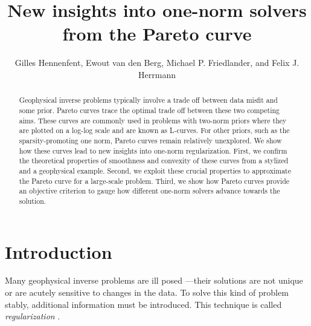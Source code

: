\author{Gilles Hennenfent\footnotemark[1], Ewout van den
  Berg\footnotemark[2], Michael P. Friedlander\footnotemark[2], and
  Felix J. Herrmann\footnotemark[1]}



\title{New insights into one-norm solvers from the Pareto curve}


\maketitle

\begin{abstract}
  Geophysical inverse problems typically involve a trade off between
  data misfit and some prior. Pareto curves trace the optimal trade
  off between these two competing aims. These curves are commonly used
  in problems with two-norm priors where they are plotted on a log-log
  scale and are known as L-curves. For other priors, such as the
  sparsity-promoting one norm, Pareto curves remain relatively
  unexplored. We show how these curves lead to new insights into
  one-norm regularization. First, we confirm the theoretical
  properties of smoothness and convexity of these curves from a
  stylized and a geophysical example. Second, we exploit these crucial
  properties to approximate the Pareto curve for a large-scale
  problem. Third, we show how Pareto curves provide an objective
  criterion to gauge how different one-norm solvers advance towards
  the solution.
\end{abstract}

\section{Introduction}

\mbox{}\indent Many geophysical inverse problems are ill posed
\cite[][]{parker94}---their solutions are not unique or are acutely
sensitive to changes in the data. To solve this kind of problem
stably, additional information must be introduced. This technique is
called \textit{regularization} \cite[see,
e.g.,][]{phillips62,tikhonov63}.

